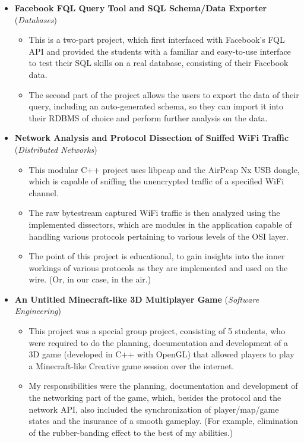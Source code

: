 \documentclass[11pt,a4paper,sans]{moderncv}
\begin{document}
\begin{itemize}
{\begin{itemize}
		\end{itemize}}
	\item	\label{db}  \textbf{Facebook FQL Query Tool and SQL Schema/Data Exporter} (\textit{Databases})
		{\small\begin{itemize}
		\item	This is a two-part project, which first interfaced with Facebook's FQL API and provided the students with a familiar and easy-to-use interface to test their SQL skills on a real database, consisting of their Facebook data.
		\item	The second part of the project allows the users to export the data of their query, including an auto-generated schema, so they can import it into their RDBMS of choice and perform further analysis on the data.
		\end{itemize}}
	\item	\label{net}  \textbf{Network Analysis and Protocol Dissection of Sniffed WiFi Traffic} (\textit{Distributed Networks})
		{\small\begin{itemize}
		\item	This modular C++ project uses libpcap and the AirPcap Nx USB dongle, which is capable of sniffing the unencrypted traffic of a specified WiFi channel.
		\item	The raw bytestream captured WiFi traffic is then analyzed using the implemented dissectors, which are modules in the application capable of handling various protocols pertaining to various levels of the OSI layer.
		\item	The point of this project is educational, to gain insights into the inner workings of various protocols as they are implemented and used on the wire. (Or, in our case, in the air.)
		\end{itemize}}
	\item	\label{seng}  \textbf{An Untitled Minecraft-like 3D Multiplayer Game} (\textit{Software Engineering})
		{\small\begin{itemize}
		\item	This project was a special group project, consisting of 5 students, who were required to do the planning, documentation and development of a 3D game (developed in C++ with OpenGL) that allowed players to play a Minecraft-like Creative game session over the internet.
		\item	My responsibilities were the planning, documentation and development of the networking part of the game, which, besides the protocol and the network API, also included the synchronization of player/map/game states and the insurance of a smooth gameplay. (For example, elimination of the rubber-banding effect to the best of my abilities.)

\end{itemize}}
\end{itemize}
\end{document}
